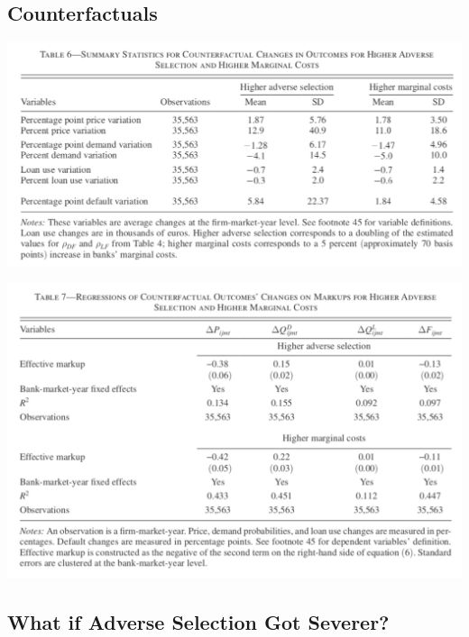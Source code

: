 \documentclass[
]{book}
\begin{document}
\hypertarget{counterfactuals}{%
\subsection{Counterfactuals}\label{counterfactuals}}

\includegraphics{figuretable/Crawford_2018_Table6.png}

\includegraphics{figuretable/Crawford_2018_Table7.png}

\hypertarget{what-if-adverse-selection-got-severer}{%
\subsection{What if Adverse Selection Got Severer?}\label{what-if-adverse-selection-got-severer}}
\end{document}
